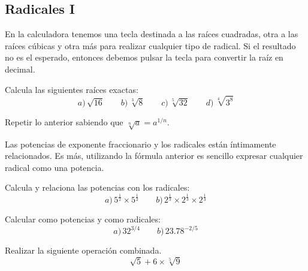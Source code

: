 \documentclass[12pt]{article}
\newcommand{\casiosymbol}[1]{{\footnotesize\casio\symbol{#1}}}
\newenvironment{capitulo}{\begin{tcolorbox}[colback=blue!5!white,colframe=red!75!black]}{\end{tcolorbox}\bigskip}
\newenvironment{ejer}{\begin{tcolorbox}[center title, 
fonttitle=\sffamily\bfseries,colback=blue!5,colframe=orange]}{\end{tcolorbox}}
\begin{document}
\newpage

\begin{capitulo}
\section*{Radicales I}
\end{capitulo}

En la calculadora tenemos una tecla destinada a las raíces cuadradas, otra a las raíces cúbicas y otra más para realizar cualquier tipo de radical. Si el resultado no es el esperado, entonces debemos pulsar la tecla \casiosymbol{110} para convertir la raíz en decimal.



\begin{ejer}

Calcula las siguientes raíces exactas:
\[
a)\, \sqrt{16} \qquad b)\,\sqrt[3]{8} \qquad c) \, \sqrt[5]{32} \qquad  d)\, \sqrt[4]{3^8}
\]

\end{ejer}

\begin{ejer} 

Repetir lo anterior sabiendo que $\sqrt[n]{a}= a^{1/n}$.

\end{ejer}

Las potencias de exponente fraccionario y los radicales están íntimamente relacionados. Es más, utilizando la fórmula anterior es sencillo expresar cualquier radical como una potencia.

\begin{ejer} 

Calcula y relaciona las potencias con los radicales:
\[
a)\, 5^\frac{1}{2} \times 5^\frac{1}{2}\qquad b)\, 2^\frac{1}{3}\times 2^\frac{1}{3} \times 2^\frac{1}{3}
\]

\end{ejer}

\begin{ejer} 

Calcular como potencias y como radicales:
\[
a)\, 32^{3/4} \qquad  b)\, 23.78^{-2/5} 
\]

\end{ejer}

\begin{ejer} 

Realizar la siguiente operación combinada.
\[
\sqrt{5} +6 \times \sqrt[5]{9}
\]

\end{ejer}
\end{document}

